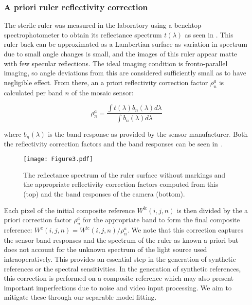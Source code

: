 \subsubsection{A priori ruler reflectivity correction}
\label{algorithmreflectivity}
The sterile ruler was measured in the laboratory using a benchtop spectrophotometer to obtain its reflectance spectrum $t(\lambda)$ as seen in .
%
%
This ruler back can be approximated as a Lambertian surface as variation in spectrum due to small angle changes is small, and the images of this ruler appear matte with few specular reflections. The ideal imaging condition is fronto-parallel imaging, so angle deviations from this are considered sufficiently small as to have negligible effect. 
%
%
From there,
an a priori reflectivity correction factor $\rho^{a}_{n}$ is calculated per band $n$ of the mosaic sensor:
\begin{linenomath*}
\begin{equation}
	\rho^{a}_{n} = \frac{\int t(\lambda)b_n(\lambda) d\lambda}{\int b_n(\lambda) d\lambda}
\label{eq:reflectivitycorrection}
\end{equation}
\end{linenomath*}
where $b_n(\lambda)$ is the band response as provided by the sensor manufacturer. Both the reflectivity correction factors and the band responses can be seen in . %
\begin{figure}[h!]
	\centering
	\texttt{[image: Figure3.pdf]}
	\caption{The reflectance spectrum of the ruler surface without markings and the appropriate reflectivity correction factors computed from this (top) and the band responses of the camera (bottom).}
	\label{fig:rulerspectrum}
\end{figure}

Each pixel of the initial composite reference $W^{\textrm{ic}}(i,j,n)$ is then divided by the a priori correction factor $\rho^{a}_{n}$ for the appropriate band to form the final composite reference: $W^{\textrm{c}}(i,j,n) = W^{\textrm{ic}}(i,j,n)/\rho^{a}_{n}$.
%
We note that this correction captures the sensor band responses and the spectrum of the ruler as known a priori but does not account for the unknown spectrum of the light source used intraoperatively. This provides an essential step in the generation of synthetic references or the spectral sensitivities. 
%
In the generation of synthetic references, this correction is performed on a composite reference which may also present important imperfections due to noise and video input processing. We aim to mitigate these through our separable model fitting.
%
%



